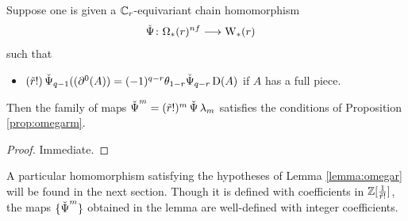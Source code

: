 

\begin{lemma} \label{lemma:omegar}
	Suppose one is given a $\mathbb{C}_r$-equivariant chain homomorphism
	\begin{align*}
		\operatorname{\check{\Psi}}\colon \Omega_*(r)^{nf}&\longrightarrow \mathrm{W}_*(r)
	\end{align*}
	such that
	\begin{itemize}
		\item $(\tilde{r}!)\operatorname{\check{\Psi}}_{q-1}((\partial^0 (A)) = (-1)^{q-r}\theta_{1-r}\check{\Psi}_{q-r}\operatorname{D}(A)$ if $A$ has a full piece.
	\end{itemize}
	Then the family of maps $\operatorname{\check{\Psi}}^m = (\tilde{r}!)^{m}\operatorname{\check{\Psi}}\lambda_m$ satisfies the conditions of Proposition \ref{prop:omegarm}.
\end{lemma}

\begin{proof}
	Immediate.
\end{proof}

\begin{remark}
    A particular homomorphism satisfying the hypotheses of Lemma \ref{lemma:omegar} will be found in the next section. Though it is defined with coefficients in $\mathbb{Z}[\frac{1}{\tilde{r}!}]$, the maps $\{\operatorname{\check{\Psi}}^m\}$ obtained in the lemma are well-defined with integer coefficients.
\end{remark}










